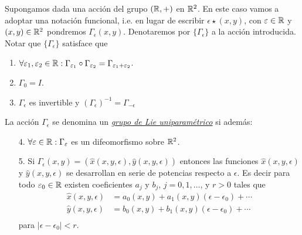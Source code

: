 \begin{definicion}  Supongamos dada una acción del grupo  $(\mathbb{R},+)$ en $\mathbb{R}^2$. En este caso vamos a adoptar una notación funcional, i.e. en lugar de escribir $\epsilon\star (x,y)$, con $\varepsilon\in\mathbb{R}$ y $(x,y)\in\mathbb{R}^2$ pondremos $\Gamma_{\epsilon}(x,y)$. Denotaremos por $\{\Gamma_{\epsilon}\}$ a la acción introducida.  Notar que $\{\Gamma_{\epsilon}\}$  satisface que 
\begin{enumerate}
 \item $\forall\varepsilon_1,\varepsilon_2\in\mathbb{R}:\Gamma_{\varepsilon_1}\circ \Gamma_{\varepsilon_2}=\Gamma_{\varepsilon_1+\varepsilon_2}$.

\item $\Gamma_0=I$.

\item $\Gamma_{\epsilon}$ es invertible y $\left(\Gamma_{\epsilon}\right)^{-1}=\Gamma_{-\epsilon}$
\end{enumerate}

La acción $\Gamma_{\epsilon}$ se denomina un  \href{http://es.wikipedia.org/wiki/Grupo_uniparamétrico}{\emph{grupo de Lie uniparamétrico}} si además:

\begin{enumerate}
\item[4.] $\forall\varepsilon\in\mathbb{R}:\Gamma_{\varepsilon}$ es un difeomorfismo sobre $\mathbb{R}^2$.


\item[5.] Si $\Gamma_{\epsilon}(x,y)=\left(\hat{x}(x,y,\epsilon),\hat{y}(x,y,\epsilon)\right)$ entonces   las funciones  $\hat{x}(x,y,\epsilon)$ y $\hat{y}(x,y,\epsilon)$  se desarrollan en serie de potencias respecto a $\epsilon$. Es decir para todo $\varepsilon_0\in\mathbb{R}$ existen coeficientes $a_j$ y $b_j$, $j=0,1,\ldots$, y $r>0$ tales que
\begin{equation}\label{eq:des_serie}
\begin{array}{cc}
\hat{x}(x,y,\epsilon)&=a_0(x,y)+a_1(x,y)(\epsilon- \epsilon_0)+\cdots\\
\hat{y}(x,y,\epsilon)&=b_0(x,y)+b_1(x,y)(\epsilon- \epsilon_0)+\cdots\\
\end{array}
\end{equation}
para $|\epsilon-\epsilon_0|<r$.
\end{enumerate}
\end{definicion}



